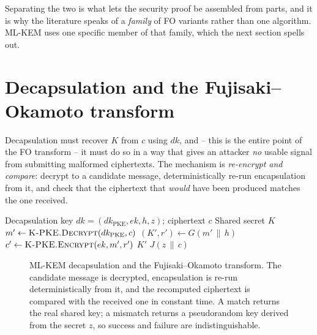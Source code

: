 Separating the two is what lets the security proof be assembled from parts, and
it is why the literature speaks of a \emph{family} of FO variants rather than one
algorithm. ML-KEM uses one specific member of that family, which the next section
spells out.

\section{Decapsulation and the Fujisaki--Okamoto transform}

Decapsulation must recover $K$ from $c$ using $dk$, and -- this is the entire point of the FO transform -- it must do so in a way that gives an attacker \emph{no} usable signal from submitting malformed ciphertexts. The mechanism is \emph{re-encrypt and compare}: decrypt to a candidate message, deterministically re-run encapsulation from it, and check that the ciphertext that \emph{would} have been produced matches the one received.

\begin{algorithm}[H]
\caption{ML-KEM.Decaps (teaching form)}
\label{alg:mlkem-decaps}
\begin{algorithmic}[1]
\Require Decapsulation key $dk=(dk_{\mathrm{PKE}}, ek, h, z)$; ciphertext $c$
\Ensure Shared secret $K$
\State $m' \gets \textsc{K-PKE.Decrypt}(dk_{\mathrm{PKE}}, c)$
\State $(K', r') \gets G(m' \,\|\, h)$
\State $c' \gets \textsc{K-PKE.Encrypt}(ek, m', r')$ 
  \State \Return $K'$ 
\Else
  \State \Return $J(z \,\|\, c)$ 
\EndIf
\end{algorithmic}
\end{algorithm}

\begin{figure}[H]
\centering
{}
\caption{ML-KEM decapsulation and the Fujisaki--Okamoto transform. The candidate message is decrypted, encapsulation is re-run deterministically from it, and the recomputed ciphertext is compared with the received one in constant time. A match returns the real shared key; a mismatch returns a pseudorandom key derived from the secret $z$, so success and failure are indistinguishable.}
\label{fig:mlkem-fo}
\end{figure}

